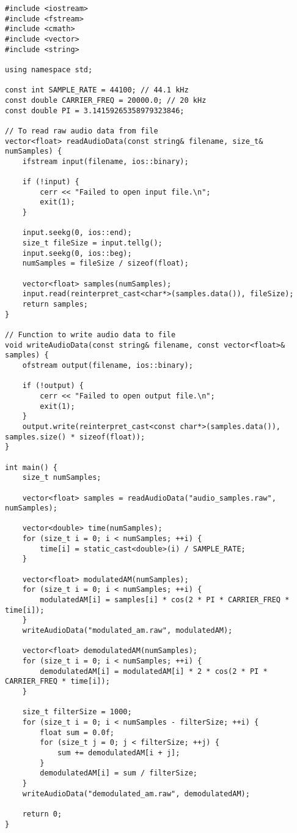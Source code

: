 \documentclass{article}
\begin{document}
\begin{verbatim}
#include <iostream>
#include <fstream>
#include <cmath>
#include <vector>
#include <string>

using namespace std;

const int SAMPLE_RATE = 44100; // 44.1 kHz
const double CARRIER_FREQ = 20000.0; // 20 kHz
const double PI = 3.14159265358979323846;

// To read raw audio data from file
vector<float> readAudioData(const string& filename, size_t& numSamples) {
    ifstream input(filename, ios::binary);

    if (!input) {
        cerr << "Failed to open input file.\n";
        exit(1);
    }

    input.seekg(0, ios::end);
    size_t fileSize = input.tellg();
    input.seekg(0, ios::beg);
    numSamples = fileSize / sizeof(float);

    vector<float> samples(numSamples);
    input.read(reinterpret_cast<char*>(samples.data()), fileSize);
    return samples;
}

// Function to write audio data to file
void writeAudioData(const string& filename, const vector<float>& samples) {
    ofstream output(filename, ios::binary);

    if (!output) {
        cerr << "Failed to open output file.\n";
        exit(1);
    }
    output.write(reinterpret_cast<const char*>(samples.data()), samples.size() * sizeof(float));
}

int main() {
    size_t numSamples;

    vector<float> samples = readAudioData("audio_samples.raw", numSamples);

    vector<double> time(numSamples);
    for (size_t i = 0; i < numSamples; ++i) {
        time[i] = static_cast<double>(i) / SAMPLE_RATE;
    }

    vector<float> modulatedAM(numSamples);
    for (size_t i = 0; i < numSamples; ++i) {
        modulatedAM[i] = samples[i] * cos(2 * PI * CARRIER_FREQ * time[i]);
    }
    writeAudioData("modulated_am.raw", modulatedAM);

    vector<float> demodulatedAM(numSamples);
    for (size_t i = 0; i < numSamples; ++i) {
        demodulatedAM[i] = modulatedAM[i] * 2 * cos(2 * PI * CARRIER_FREQ * time[i]);
    }

    size_t filterSize = 1000;
    for (size_t i = 0; i < numSamples - filterSize; ++i) {
        float sum = 0.0f;
        for (size_t j = 0; j < filterSize; ++j) {
            sum += demodulatedAM[i + j];
        }
        demodulatedAM[i] = sum / filterSize;
    }
    writeAudioData("demodulated_am.raw", demodulatedAM);

    return 0;
}
\end{verbatim}
\end{document}
